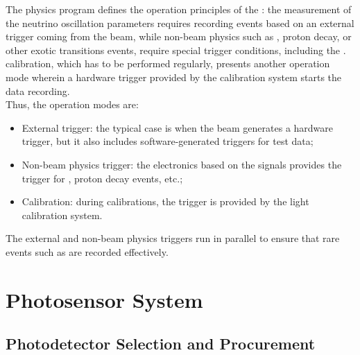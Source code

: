 The physics program defines the operation principles of the : the measurement of the neutrino oscillation parameters requires recording events based on an external trigger coming from the beam, while non-beam physics such as  , proton decay, or other exotic transitions events, require special trigger conditions, including the .  calibration, which has to be performed regularly, presents another operation mode wherein  a hardware trigger provided by the calibration system starts the data recording. \\    

Thus, the operation modes are:
\begin{itemize}
\item External trigger: %
the typical case is when the beam generates a hardware trigger,  %
but it also includes software-generated triggers for test data;
\item Non-beam physics trigger: the electronics based on the  signals provides the trigger for  , proton decay events, etc.;
\item Calibration: during  calibrations, the trigger is provided by the light calibration system.
\end{itemize}

The external and non-beam physics triggers run in parallel to ensure that rare events such as   are recorded effectively.

\section{Photosensor System}
\label{sec:fddp-pd-2}

\subsection{Photodetector Selection and Procurement}
\label{sec:fddp-pd-2.1}

